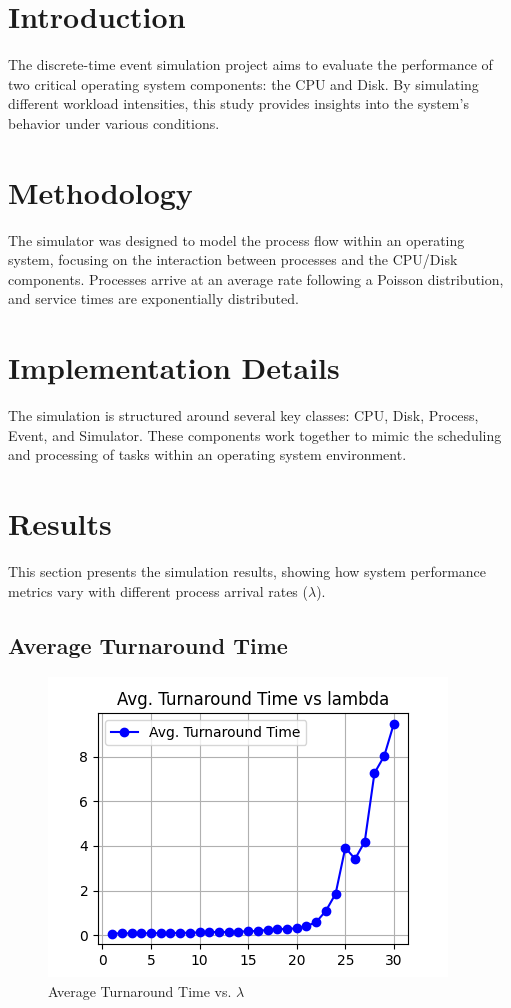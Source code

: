 \documentclass[12pt]{article}
\begin{document}
\section{Introduction}
The discrete-time event simulation project aims to evaluate the performance of two critical operating system components: the CPU and Disk. By simulating different workload intensities, this study provides insights into the system's behavior under various conditions.

\section{Methodology}
The simulator was designed to model the process flow within an operating system, focusing on the interaction between processes and the CPU/Disk components. Processes arrive at an average rate following a Poisson distribution, and service times are exponentially distributed.

\section{Implementation Details}
The simulation is structured around several key classes: CPU, Disk, Process, Event, and Simulator. These components work together to mimic the scheduling and processing of tasks within an operating system environment.

\section{Results}
This section presents the simulation results, showing how system performance metrics vary with different process arrival rates ($\lambda$).

\subsection{Average Turnaround Time}
\begin{figure}[H]
\centerline{\includegraphics{figs/Avg. Turnaround Time_vs_lambda.png}}
\caption{Average Turnaround Time vs. $\lambda$}
\end{figure}
\end{document}
